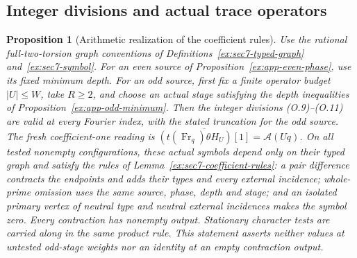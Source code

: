 \documentclass[11pt]{article}
\newtheorem{proposition}[theorem]{Proposition}
\theoremstyle{definition}
\theoremstyle{remark}
\begin{document}
\subsection{Integer divisions and actual trace operators}
\begin{proposition}[Arithmetic realization of the coefficient rules]\label{ex:app-coefficient-rules}
Use the rational full-two-torsion graph conventions of
Definitions~\ref{ex:sec7-typed-graph} and~\ref{ex:sec7-symbol}.
For an even source of Proposition~\ref{ex:app-even-phase}, use its
fixed minimum depth. For an odd source, first fix a finite operator
budget $|U|\le W$, take $R\ge2$, and choose an actual stage satisfying
the depth inequalities of Proposition~\ref{ex:app-odd-minimum}.
Then the integer divisions (O.9)--(O.11) are valid at every Fourier
index, with the stated truncation for the odd source.
The fresh coefficient-one reading is
$\overline{(t(\operatorname{Fr}_q)\theta H_U)[1]}=\mathcal A(Uq)$.
On all tested nonempty configurations, these actual symbols depend
only on their typed graph and satisfy the rules of
Lemma~\ref{ex:sec7-coefficient-rules}: a pair difference
contracts the endpoints and adds their types and every external
incidence; whole-prime omission uses the same source, phase, depth
and stage; and an isolated primary vertex of neutral type and
neutral external incidences makes the symbol zero.
Every contraction has nonempty output. Stationary character tests
are carried along in the same product rule. This statement asserts
neither values at untested odd-stage weights nor an identity at an
empty contraction output.
\end{proposition}
\end{document}
